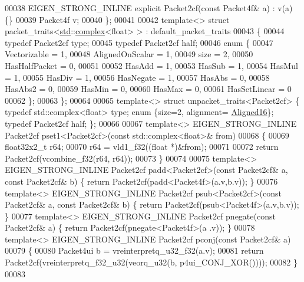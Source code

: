 \begin{DoxyCode}
00038   EIGEN\_STRONG\_INLINE \textcolor{keyword}{explicit} Packet2cf(\textcolor{keyword}{const} Packet4f& a) : v(a) \{\}
00039   Packet4f  v;
00040 \};
00041 
00042 \textcolor{keyword}{template}<> \textcolor{keyword}{struct }packet\_traits<\hyperlink{namespacestd}{std}::\hyperlink{structcomplex}{complex}<float> >  : default\_packet\_traits
00043 \{
00044   \textcolor{keyword}{typedef} Packet2cf type;
00045   \textcolor{keyword}{typedef} Packet2cf half;
00046   \textcolor{keyword}{enum} \{
00047     Vectorizable = 1,
00048     AlignedOnScalar = 1,
00049     size = 2,
00050     HasHalfPacket = 0,
00051 
00052     HasAdd    = 1,
00053     HasSub    = 1,
00054     HasMul    = 1,
00055     HasDiv    = 1,
00056     HasNegate = 1,
00057     HasAbs    = 0,
00058     HasAbs2   = 0,
00059     HasMin    = 0,
00060     HasMax    = 0,
00061     HasSetLinear = 0
00062   \};
00063 \};
00064 
00065 \textcolor{keyword}{template}<> \textcolor{keyword}{struct }unpacket\_traits<Packet2cf> \{ \textcolor{keyword}{typedef} std::complex<float> type; \textcolor{keyword}{enum} \{size=2, alignment=
      \hyperlink{group__enums_gga45fe06e29902b7a2773de05ba27b47a1af8e2bf74b04c02199f62c5e3c06dbfcc}{Aligned16}\}; \textcolor{keyword}{typedef} Packet2cf half; \};
00066 
00067 \textcolor{keyword}{template}<> EIGEN\_STRONG\_INLINE Packet2cf pset1<Packet2cf>(\textcolor{keyword}{const} std::complex<float>&  from)
00068 \{
00069   float32x2\_t r64;
00070   r64 = vld1\_f32((\textcolor{keywordtype}{float} *)&from);
00071 
00072   \textcolor{keywordflow}{return} Packet2cf(vcombine\_f32(r64, r64));
00073 \}
00074 
00075 \textcolor{keyword}{template}<> EIGEN\_STRONG\_INLINE Packet2cf padd<Packet2cf>(\textcolor{keyword}{const} Packet2cf& a, \textcolor{keyword}{const} Packet2cf& b) \{ \textcolor{keywordflow}{return} 
      Packet2cf(padd<Packet4f>(a.v,b.v)); \}
00076 \textcolor{keyword}{template}<> EIGEN\_STRONG\_INLINE Packet2cf psub<Packet2cf>(\textcolor{keyword}{const} Packet2cf& a, \textcolor{keyword}{const} Packet2cf& b) \{ \textcolor{keywordflow}{return} 
      Packet2cf(psub<Packet4f>(a.v,b.v)); \}
00077 \textcolor{keyword}{template}<> EIGEN\_STRONG\_INLINE Packet2cf pnegate(\textcolor{keyword}{const} Packet2cf& a) \{ \textcolor{keywordflow}{return} Packet2cf(pnegate<Packet4f>(a
      .v)); \}
00078 \textcolor{keyword}{template}<> EIGEN\_STRONG\_INLINE Packet2cf pconj(\textcolor{keyword}{const} Packet2cf& a)
00079 \{
00080   Packet4ui b = vreinterpretq\_u32\_f32(a.v);
00081   \textcolor{keywordflow}{return} Packet2cf(vreinterpretq\_f32\_u32(veorq\_u32(b, p4ui\_CONJ\_XOR())));
00082 \}
00083 

\end{DoxyCode}
